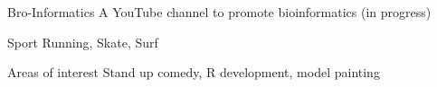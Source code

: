 
\begin{cvskills}

  \cvskill
    {Bro-Informatics} %
    {A YouTube channel to promote bioinformatics (in progress)} %

  \cvskill
    {Sport} %
    {Running, Skate, Surf} %
    
  \cvskill
    {Areas of interest} %
    {Stand up comedy, R development, model painting} %
    
\end{cvskills}